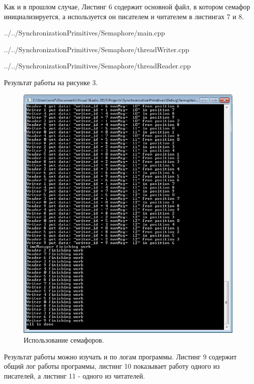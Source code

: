 \documentclass[a4paper, 12pt]{article}		%
\begin{document}
Как и в прошлом случае, Листинг 6 содержит основной файл, в котором семафор инициализируется, а используется он писателем и читателем в листингах 7 и 8.


{../../SynchronizationPrimitives/Semaphore/main.cpp}
\newpage


{../../SynchronizationPrimitives/Semaphore/threadWriter.cpp}


{../../SynchronizationPrimitives/Semaphore/threadReader.cpp}

Результат работы на рисунке 3.

\begin{figure}[h!]
\centering
\includegraphics[scale=0.99]{res/002}
\caption{Использование семафоров.}
\end{figure}

Результат работы можно изучать и по логам программы. Листинг 9 содержит общий лог работы программы, листинг 10 показывает работу одного из писателей, а листинг 11 - одного из читателей.
\end{document}
